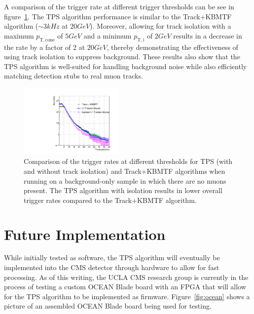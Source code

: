 A comparison of the trigger rate at different trigger thresholds can be see in figure~\ref{fig:rates}.
The TPS algorithm performance is similar to the Track+KBMTF algorithm ($\sim3\unit{kHz}$ at $20\unit{GeV}$).
Moreover, allowing for track isolation with a maximum $p_\mathrm{T,cone}$ of $5\unit{GeV}$ and a minimum $p_{\mathrm{T,i}}$ of $2\unit{GeV}$ results in a decrease in the rate by a factor of 2 at $20\unit{GeV}$, thereby demonstrating the effectiveness of using track isolation to suppress background.
These results also show that the TPS algorithm is well-suited for handling background noise while also efficiently matching detection stubs to real muon tracks.

\begin{figure}[htbp]
  \centering
  \includegraphics[width=0.45\textwidth]{fig/TPS/rateVsPt_TPSIsol.pdf}
  \caption{
    Comparison of the trigger rates at different \pt thresholds for TPS (with and without track isolation) and Track+KBMTF algorithms when running on a background-only sample in which there are no muons present.
    The TPS algorithm with isolation results in lower overall trigger rates compared to the Track+KBMTF algorithm.
  }
  \label{fig:rates}
\end{figure}

\section{Future Implementation}
\label{subsec:TPSResults}

While initially tested as software, the TPS algorithm will eventually be implemented into the CMS detector through hardware to allow for fast processing.
As of this writing, the UCLA CMS research group is currently in the process of testing a custom OCEAN Blade board with an FPGA that will allow for the TPS algorithm to be implemented as firmware.
Figure~\ref{fig:ocean} shows a picture of an assembled OCEAN Blade board being used for testing.

